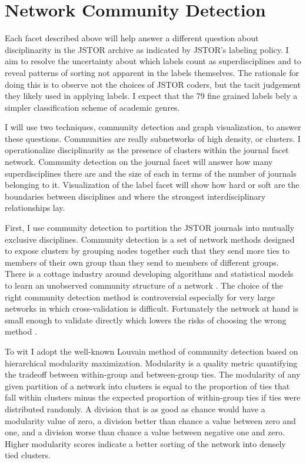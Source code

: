 \documentclass[]{book}
\begin{document}
\section{Network Community Detection}\label{network-community-detection}

Each facet described above will help answer a different question about
disciplinarity in the JSTOR archive as indicated by JSTOR's labeling
policy. I aim to resolve the uncertainty about which labels count as
superdisciplines and to reveal patterns of sorting not apparent in the
labels themselves. The rationale for doing this is to observe not the
choices of JSTOR coders, but the tacit judgement they likely used in
applying labels. I expect that the 79 fine grained labels bely a simpler
classification scheme of academic genres.

I will use two techniques, community detection and graph visualization,
to answer these questions. Communities are really subnetworks of high
density, or clusters. I operationalize disciplinarity as the presence of
clusters within the journal facet network. Community detection on the
journal facet will answer how many superdisciplines there are and the
size of each in terms of the number of journals belonging to it.
Visualization of the label facet will show how hard or soft are the
boundaries between disciplines and where the strongest interdisciplinary
relationships lay.

First, I use community detection to partition the JSTOR journals into
mutually exclusive disciplines. Community detection is a set of network
methods designed to expose clusters by grouping nodes together such that
they send more ties to members of their own group than they send to
members of different groups. There is a cottage industry around
developing algorithms and statistical models to learn an unobserved
community structure of a network \citep[see][ for an excellent
review]{Fortunato2016Community}. The choice of the right community
detection method is controversial especially for very large networks in
which cross-validation is difficult. Fortunately the network at hand is
small enough to validate directly which lowers the risks of choosing the
wrong method .

To wit I adopt the well-known Louvain method of community detection
based on hierarchical modularity maximization. \citep{Blondel2008Fast}
Modularity is a quality metric quantifying the tradeoff between
within-group and between-group ties. The modularity of any given
partition of a network into clusters is equal to the proportion of ties
that fall within clusters minus the expected proportion of within-group
ties if ties were distributed randomly. A division that is as good as
chance would have a modularity value of zero, a division better than
chance a value between zero and one, and a division worse than chance a
value between negative one and zero. \citep[8]{Newman2004Finding} Higher
modularity scores indicate a better sorting of the network into densely
tied clusters.
\end{document}
